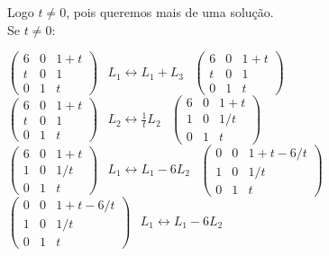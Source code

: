 \documentclass[12pt]{article}
\begin{document}
\begin{enumerate}
\begin{center}
	\end{center}	
	Logo $t \neq 0$, pois queremos mais de uma solução.\\[5pt]
	Se $t \neq 0$:
	\begin{center}
		$\begin{pmatrix} 6 & 0 & 1 + t \\ t & 0 & 1 \\ 0 & 1 & t \end{pmatrix}$
		$\begin{matrix} L_1 \leftrightarrow L_1 + L_3	 \end{matrix}$
		$\begin{pmatrix} 6 & 0 & 1 + t \\ t & 0 & 1 \\ 0 & 1 & t \end{pmatrix}$\\[10pt]
		$\begin{pmatrix} 6 & 0 & 1 + t \\ t & 0 & 1 \\ 0 & 1 & t \end{pmatrix}$
		$\begin{matrix} L_2 \leftrightarrow \frac{1}{t}L_2 \end{matrix}$
		$\begin{pmatrix} 6 & 0 & 1 + t \\ 1 & 0 & 1/t \\ 0 & 1 & t \end{pmatrix}$\\[10pt]
		$\begin{pmatrix} 6 & 0 & 1 + t \\ 1 & 0 & 1/t \\ 0 & 1 & t \end{pmatrix}$
		$\begin{matrix} L_1 \leftrightarrow L_1 - 6L_2 \end{matrix}$
		$\begin{pmatrix} 0 & 0 & 1 + t - 6/t \\ 1 & 0 & 1/t \\ 0 & 1 & t \end{pmatrix}$\\[10pt]
		$\begin{pmatrix} 0 & 0 & 1 + t - 6/t \\ 1 & 0 & 1/t \\ 0 & 1 & t \end{pmatrix}$
		$\begin{matrix} L_1 \leftrightarrow L_1 - 6L_2 \end{matrix}$

\end{center}
\end{enumerate}
\end{document}
